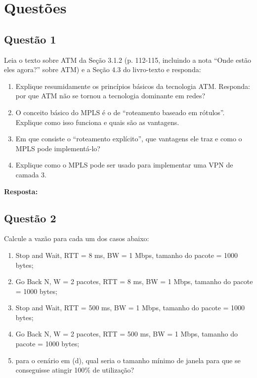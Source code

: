 \section{Questões}\label{sec:questoes}


\subsection{Questão 1}
Leia o texto sobre ATM da Seção 3.1.2 (p. 112-115, incluindo a nota
“Onde estão eles agora?” sobre ATM) e a Seção 4.3 do livro-texto e responda:


\begin{enumerate}[label=\alph*.]
    \item Explique resumidamente os princípios básicos da tecnologia ATM. Responda: por
que ATM não se tornou a tecnologia dominante em redes?
    \item O conceito básico do MPLS é o de “roteamento baseado em rótulos”. Explique
como isso funciona e quais são as vantagens.
    \item  Em que consiste o “roteamento explícito”, que vantagens ele traz e como o
MPLS pode implementá-lo?
    \item Explique como o MPLS pode ser usado para implementar uma VPN de camada 3.
\end{enumerate}

\noindent
\textbf{Resposta:} \\


\subsection{Questão 2}
 Calcule a vazão para cada um dos casos abaixo:

\begin{enumerate}[label=\alph*.]
    \item Stop and Wait, RTT = 8 ms, BW = 1 Mbps, tamanho do pacote = 1000 bytes;
    \item Go Back N, W = 2 pacotes, RTT = 8 ms, BW = 1 Mbps, tamanho do pacote = 1000
bytes;
    \item Stop and Wait, RTT = 500 ms, BW = 1 Mbps, tamanho do pacote = 1000 bytes;
    \item  Go Back N, W = 2 pacotes, RTT = 500 ms, BW = 1 Mbps, tamanho do pacote = 1000
bytes;
    \item para o cenário em (d), qual seria o tamanho mínimo de janela para que se
conseguisse atingir 100\% de utilização? 
\end{enumerate}

